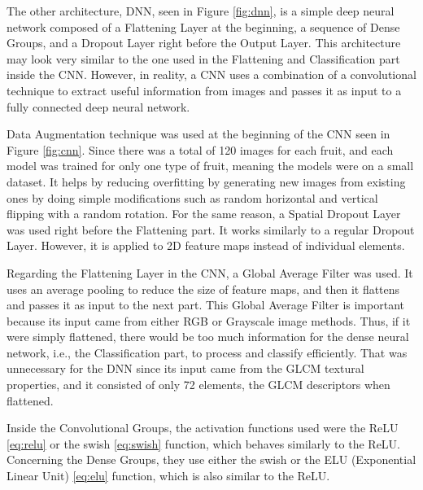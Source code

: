 \documentclass[../main.tex]{subfile}
\begin{document}


The other architecture, DNN, seen in Figure \ref{fig:dnn}, is a simple deep neural network composed of a Flattening Layer at the beginning, a sequence of Dense Groups, and a Dropout Layer right before the Output Layer. This architecture may look very similar to the one used in the Flattening and Classification part inside the CNN. However, in reality, a CNN uses a combination of a convolutional technique to extract useful information from images and passes it as input to a fully connected deep neural network.

Data Augmentation technique was used at the beginning of the CNN seen in Figure \ref{fig:cnn}. Since there was a total of 120 images for each fruit, and each model was trained for only one type of fruit, meaning the models were on a small dataset. It helps by reducing overfitting by generating new images from existing ones by doing simple modifications such as random horizontal and vertical flipping with a random rotation. For the same reason, a Spatial Dropout Layer was used right before the Flattening part. It works similarly to a regular Dropout Layer. However, it is applied to 2D feature maps instead of individual elements.

Regarding the Flattening Layer in the CNN, a Global Average Filter was used. It uses an average pooling to reduce the size of feature maps, and then it flattens and passes it as input to the next part. This Global Average Filter is important because its input came from either RGB or Grayscale image methods. Thus, if it were simply flattened, there would be too much information for the dense neural network, i.e., the Classification part, to process and classify efficiently. That was unnecessary for the DNN since its input came from the GLCM textural properties, and it consisted of only 72 elements, the GLCM descriptors when flattened.

Inside the Convolutional Groups, the activation functions used were the ReLU \eqref{eq:relu} or the swish \eqref{eq:swish} function, which behaves similarly to the ReLU. Concerning the Dense Groups, they use either the swish or the ELU (Exponential Linear Unit) \eqref{eq:elu} function, which is also similar to the ReLU.
\end{document}
